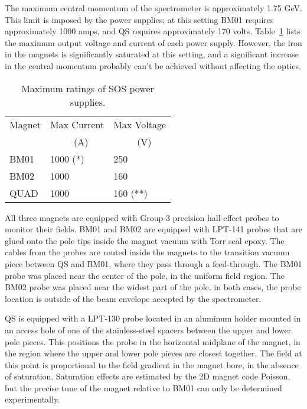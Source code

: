 The maximum central momentum of the spectrometer is approximately 1.75 GeV.
This limit is imposed by the power supplies; at this setting BM01 requires
approximately 1000 amps, and QS requires approximately 170 volts. 
Table~\ref{tab:sos_ratings}
lists the maximum output voltage and current of each power supply. However, the
iron in the magnets is significantly saturated at this setting, and a 
significant
increase in the central momentum probably can't be achieved without affecting
the optics.

\begin{table}
\begin{center}
\caption{Maximum ratings of SOS power supplies. \label{tab:sos_ratings}}
\vspace{\baselineskip}
  \begin{tabular}{lll}
Magnet         &Max Current    &Max Voltage    \\
                     &~~~~~(A)        &~~~~~(V)              \\
\hline
BM01           &1000 (*)       &250            \\
BM02           &1000           &160            \\
QUAD           &1000           &160 (**)       \\
\end{tabular}
\end{center}
\newline
{}

\end{table}

All three magnets are equipped with Group-3 precision hall-effect probes to
monitor their fields. BM01 and BM02 are equipped with LPT-141 probes that are
glued onto the pole tips inside the magnet vacuum with Torr seal epoxy. The cables
from the probes are routed inside the magnets to the transition vacuum piece
between QS and BM01, where they pass through a feed-through. The BM01 probe was
placed near the center of the pole, in the uniform field region. The BM02 probe
was placed near the widest part of the pole. in both cases, the probe location
is outside of the beam envelope accepted by the spectrometer.

QS is equipped with a LPT-130 probe located in an aluminum holder mounted in an
access hole of one of the stainless-steel spacers between the upper and lower
pole pieces. This positions the probe in the horizontal midplane of the magnet,
in the region where the upper and lower pole pieces are closest together. The
field at this point is proportional to the field gradient in the magnet bore, in
the absence of saturation. Saturation effects are estimated by the 2D magnet
code Poisson, but the precise tune of the magnet relative to BM01 can only be
determined experimentally.


